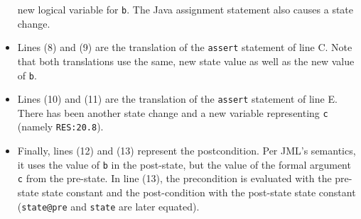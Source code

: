 \documentclass{sig-alternate2}
\begin{document}
\begin{itemize}
new logical variable for \texttt{b}.  The Java assignment statement also causes a state change.
\item Lines (8) and (9) are the translation of the \texttt{assert} statement of line C.  Note that both translations use the same, new state value as well as the new value of \texttt{b}.
\item Lines (10) and (11) are the translation of the \texttt{assert} statement of line E.  There has been another state change and a new variable representing \texttt{c} (namely \texttt{RES:20.8}).
\item Finally, lines (12) and (13) represent the postcondition.  Per JML's semantics, it uses the
value of \texttt{b} in the post-state, but the value of the formal argument \texttt{c} from the pre-state.
In line (13), the precondition is evaluated with the pre-state state constant and the post-condition
with the post-state state constant (\texttt{state@pre} and \texttt{state} are later equated).
\end{itemize}


\end{document}
